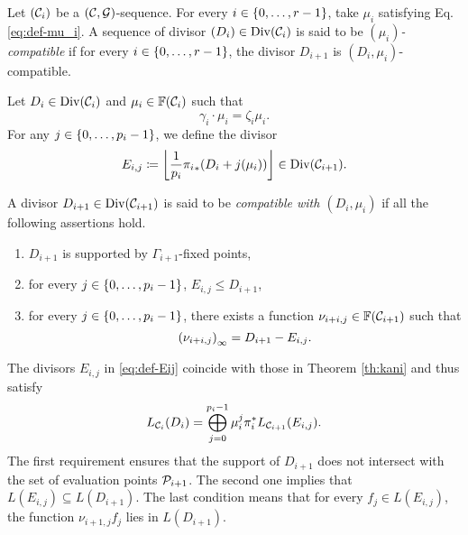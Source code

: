\documentclass[10pt]{article}
\begin{document}
\begin{definition}\label{def-mu_i_compatible}
	Let $(\mathcal{C}_i)$ be a $(\mathcal{C},\mathcal{G})$-sequence. For every $i \in \left\{0,\dots,r-1\right\}$, take $\mu_i$ satisfying Eq. \eqref{eq:def-mu_i}. A sequence of divisor $(D_i) \in \operatorname{Div}(\mathcal{C}_i)$ is said to be \emph{$(\mu_i)$-compatible} if for every $i \in \left\{0,\dots,r-1\right\}$, the divisor $D_{i+1}$ is $(D_i,\mu_i)$-compatible.
\end{definition}


\begin{definition}\label{def-div_compatible}
	Let $D_i \in \operatorname{Div}(\mathcal{C}_i)$ and $\mu_i \in \mathbb{F}(\mathcal{C}_i)$ such that 
	\begin{equation}\label{eq:def-mu_i}
		\gamma_i \cdot \mu_i = \zeta_i \mu_i.
	\end{equation} For any $j \in \left\{0,\dots,p_i-1\right\}$, we define the divisor 
	\begin{equation}\label{eq:def-Eij}
		E_{i,j}\coloneqq \left\lfloor\frac{1}{p_i}{\pi_i}_*( D_i + j(\mu_i))\right\rfloor \in \operatorname{Div}(\mathcal{C}_{i+1}).
	\end{equation}
	
	A divisor $D_{i+1} \in \operatorname{Div}(\mathcal{C}_{i+1})$ is said to be \emph{compatible with $(D_i,\mu_i)$} if all the following assertions hold.
	\begin{enumerate}
		\item $D_{i+1}$ is supported by $\Gamma_{i+1}$-fixed points, 
		\item for every $j \in \left\{0,\dots,p_i-1\right\}$, $E_{i,j} \leq D_{i+1}$,
		\item  for every $j \in \left\{0,\dots,p_i-1\right\}$, there exists a function $\nu_{i+i,j}\in \mathbb{F}(\mathcal{C}_{i+1})$ such that
		\begin{equation}\label{eq:def-nu_i,j}
			\left( \nu_{i+i,j} \right)_\infty=D_{i+1} - E_{i,j}.	
		\end{equation}
	\end{enumerate}
\end{definition}


The divisors $E_{i,j}$ in \eqref{eq:def-Eij} coincide with those in Theorem \ref{th:kani} and thus satisfy
\begin{equation}\label{eq:decomposition}
	L_{\mathcal{C}_i}(D_i)= \bigoplus_{j=0}^{p_i-1} \mu_i^j \pi_i^* L_{\mathcal{C}_{i+1}}(E_{i,j}).
\end{equation}
The first requirement ensures that the support of $D_{i+1}$ does not intersect with the set of evaluation points $\mathcal{P}_{i+1}$. The second one implies that $L(E_{i,j}) \subseteq L(D_{i+1})$. The last condition means that for every $f_j \in L(E_{i,j})$, the function $\nu_{i+1, j}f_j$ lies in $L(D_{i+1})$.
\end{document}
